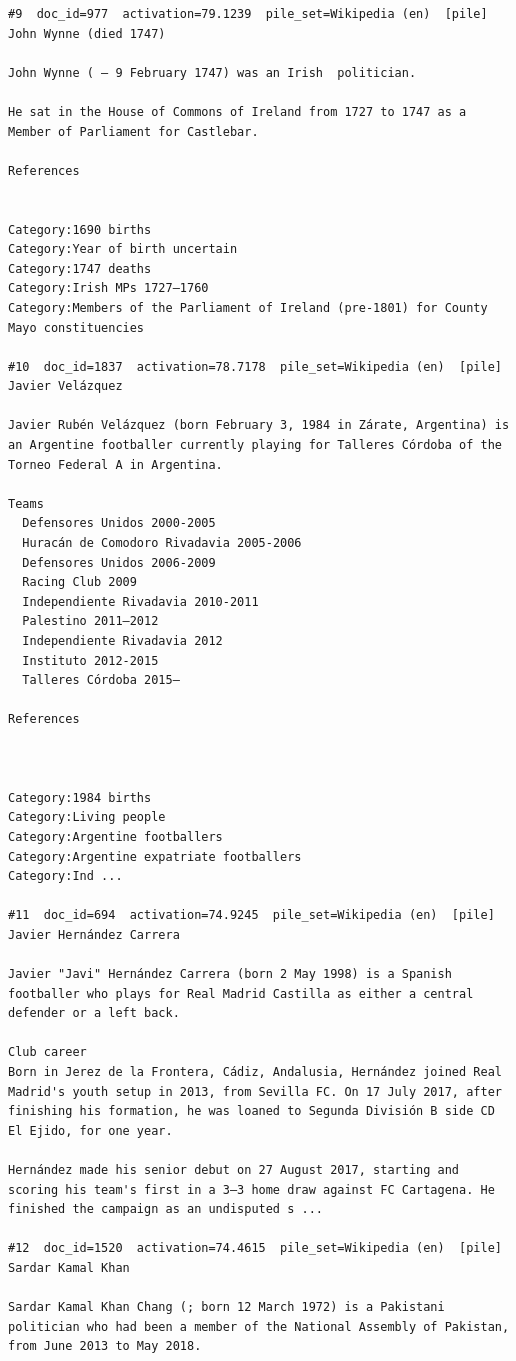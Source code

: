 \begin{verbatim}
#9  doc_id=977  activation=79.1239  pile_set=Wikipedia (en)  [pile]
John Wynne (died 1747)

John Wynne ( – 9 February 1747) was an Irish  politician.

He sat in the House of Commons of Ireland from 1727 to 1747 as a Member of Parliament for Castlebar.

References 
 

Category:1690 births
Category:Year of birth uncertain
Category:1747 deaths
Category:Irish MPs 1727–1760
Category:Members of the Parliament of Ireland (pre-1801) for County Mayo constituencies

#10  doc_id=1837  activation=78.7178  pile_set=Wikipedia (en)  [pile]
Javier Velázquez

Javier Rubén Velázquez (born February 3, 1984 in Zárate, Argentina) is an Argentine footballer currently playing for Talleres Córdoba of the Torneo Federal A in Argentina.

Teams
  Defensores Unidos 2000-2005
  Huracán de Comodoro Rivadavia 2005-2006
  Defensores Unidos 2006-2009
  Racing Club 2009
  Independiente Rivadavia 2010-2011
  Palestino 2011–2012
  Independiente Rivadavia 2012
  Instituto 2012-2015
  Talleres Córdoba 2015–

References
 
 

Category:1984 births
Category:Living people
Category:Argentine footballers
Category:Argentine expatriate footballers
Category:Ind ...

#11  doc_id=694  activation=74.9245  pile_set=Wikipedia (en)  [pile]
Javier Hernández Carrera

Javier "Javi" Hernández Carrera (born 2 May 1998) is a Spanish footballer who plays for Real Madrid Castilla as either a central defender or a left back.

Club career
Born in Jerez de la Frontera, Cádiz, Andalusia, Hernández joined Real Madrid's youth setup in 2013, from Sevilla FC. On 17 July 2017, after finishing his formation, he was loaned to Segunda División B side CD El Ejido, for one year.

Hernández made his senior debut on 27 August 2017, starting and scoring his team's first in a 3–3 home draw against FC Cartagena. He finished the campaign as an undisputed s ...

#12  doc_id=1520  activation=74.4615  pile_set=Wikipedia (en)  [pile]
Sardar Kamal Khan

Sardar Kamal Khan Chang (; born 12 March 1972) is a Pakistani politician who had been a member of the National Assembly of Pakistan, from June 2013 to May 2018.


\end{verbatim}
